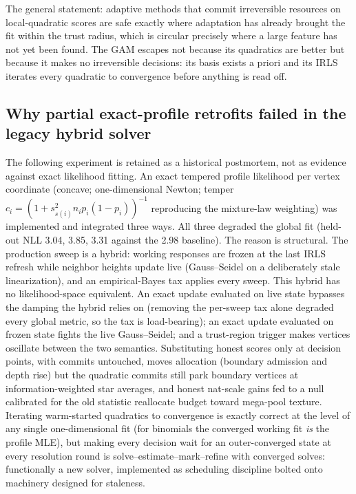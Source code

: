 \documentclass[11pt]{article}
\begin{document}
The general statement: adaptive methods that commit irreversible
resources on local-quadratic scores are safe exactly where adaptation
has already brought the fit within the trust radius, which is circular
precisely where a large feature has not yet been found. The GAM
escapes not because its quadratics are better but because it makes no
irreversible decisions: its basis exists a priori and its IRLS
iterates every quadratic to convergence before anything is read off.

\subsection{Why partial exact-profile retrofits failed in the legacy hybrid solver}

The following experiment is retained as a historical postmortem, not as evidence against exact
likelihood fitting. An exact tempered profile likelihood per vertex coordinate (concave;
one-dimensional Newton; temper $c_i = (1+s^2_{s(i)} n_i p_i(1-p_i))^{-1}$
reproducing the mixture-law weighting) was implemented and integrated
three ways. All three degraded the global fit (held-out NLL 3.04,
3.85, 3.31 against the 2.98 baseline). The reason is structural. The
production sweep is a hybrid: working responses are frozen at the last
IRLS refresh while neighbor heights update live (Gauss--Seidel on a
deliberately stale linearization), and an empirical-Bayes tax applies
every sweep. This hybrid has no likelihood-space equivalent. An exact
update evaluated on live state bypasses the damping the hybrid relies
on (removing the per-sweep tax alone degraded every global metric,
so the tax is load-bearing); an exact update evaluated on frozen
state fights the live Gauss--Seidel; and a trust-region trigger makes
vertices oscillate between the two semantics. Substituting honest
scores only at decision points, with commits untouched, moves
allocation (boundary admission and depth rise) but the quadratic
commits still park boundary vertices at information-weighted star
averages, and honest nat-scale gains fed to a null calibrated for the
old statistic reallocate budget toward mega-pool texture. Iterating
warm-started quadratics to convergence is exactly correct at the level
of any single one-dimensional fit (for binomials the converged working
fit \emph{is} the profile MLE), but making every decision wait for an
outer-converged state at every resolution round is
solve--estimate--mark--refine with converged solves: functionally a
new solver, implemented as scheduling discipline bolted onto machinery
designed for staleness.
\end{document}
